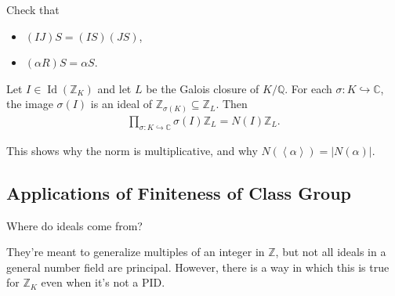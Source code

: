 \begin{exercise}

Check that

\begin{itemize}
\tightlist
\item
  \((IJ)S = (IS)(JS)\),
\item
  \((\alpha R)S = \alpha S\).
\end{itemize}

\end{exercise}

\begin{theorem}

Let \(I\in \operatorname{Id}({\mathbb{Z}}_K)\) and let \(L\) be the
Galois closure of \(K/{\mathbb{Q}}\). For each
\(\sigma: K\hookrightarrow{\mathbb{C}}\), the image \(\sigma(I)\) is an
ideal of \({\mathbb{Z}}_{\sigma(K)} \subseteq {\mathbb{Z}}_L\). Then
\begin{align*}
\prod_{\sigma: K\hookrightarrow{\mathbb{C}}} \sigma(I) {\mathbb{Z}}_L = N(I) {\mathbb{Z}}_L
.\end{align*}

\end{theorem}

\begin{remark}

This shows why the norm is multiplicative, and why
\(N( \left\langle{ \alpha }\right\rangle) = |N( \alpha ) |\).

\end{remark}

\hypertarget{applications-of-finiteness-of-class-group}{%
\subsection{Applications of Finiteness of Class
Group}\label{applications-of-finiteness-of-class-group}}

\begin{question}

Where do ideals come from?

\end{question}

\begin{remark}

They're meant to generalize multiples of an integer in \({\mathbb{Z}}\),
but not all ideals in a general number field are principal. However,
there is a way in which this is true for \({\mathbb{Z}}_K\) even when
it's not a PID.

\end{remark}

